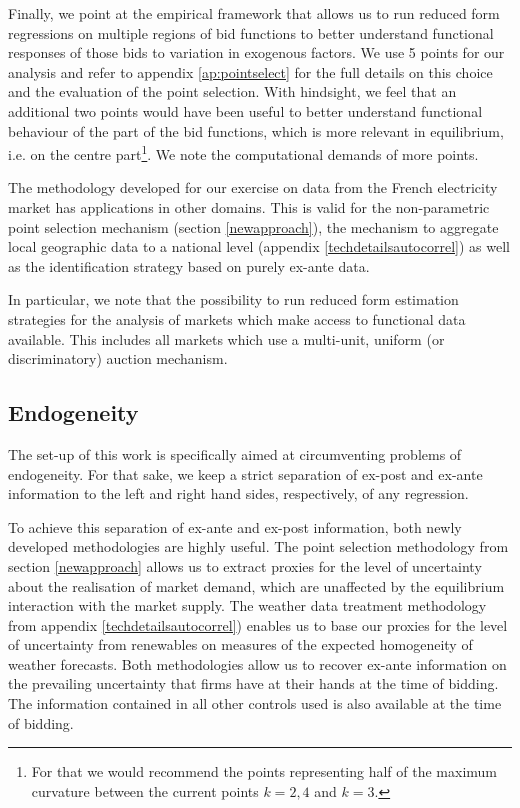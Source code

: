 Finally, we point at the empirical framework that allows us to run reduced form regressions on multiple regions of bid functions to better understand functional responses of those bids to variation in exogenous factors. We use 5 points for our analysis and refer to appendix \ref{ap:pointselect} for the full details on this choice and the evaluation of the point selection. With hindsight, we feel that an additional two points would have been useful to better understand functional behaviour of the part of the bid functions, which is more relevant in equilibrium, i.e. on the centre part\footnote{For that we would recommend the points representing half of the maximum curvature between the current points $k=2,4$ and $k=3$.}. 
We note the computational demands of more points. 

\label{externalvalidity}
The methodology developed for our exercise on data from the French electricity market has applications in other domains. This is valid for the non-parametric point selection mechanism (section \ref{newapproach}), the mechanism to aggregate local geographic data to a national level (appendix \ref{techdetailsautocorrel}) as well as the identification strategy based on purely ex-ante data. 

In particular, we note that the possibility to run reduced form estimation strategies for the analysis of markets which make access to functional data available. This includes all markets which use a multi-unit, uniform (or discriminatory) auction mechanism. 


\subsection{Endogeneity}
\label{endogeneityconcern}
The set-up of this work is specifically aimed at  circumventing problems of endogeneity. For that sake, we keep a strict separation of ex-post and ex-ante information to the left and right hand sides, respectively, of any regression. 

To achieve this separation of ex-ante and ex-post information, both newly developed methodologies are highly useful. The point selection methodology from section \ref{newapproach} allows us to extract proxies for the level of uncertainty about the realisation of market demand, which are unaffected by the equilibrium interaction with the market supply.
The weather data treatment methodology from appendix \ref{techdetailsautocorrel}) enables us to base our proxies for the level of uncertainty from renewables on measures of the expected homogeneity of weather forecasts. 
Both methodologies allow us to recover ex-ante information on the prevailing uncertainty that firms have at their hands at the time of bidding. The information contained in all other controls used is also available at the time of bidding. 

